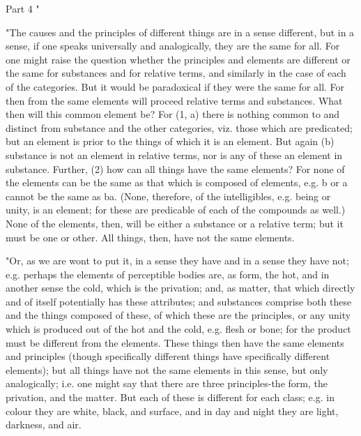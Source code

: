 Part 4 "

"The causes and the principles of different things are in a sense
different, but in a sense, if one speaks universally and analogically,
they are the same for all. For one might raise the question whether
the principles and elements are different or the same for substances
and for relative terms, and similarly in the case of each of the categories.
But it would be paradoxical if they were the same for all. For then
from the same elements will proceed relative terms and substances.
What then will this common element be? For (1, a) there is nothing
common to and distinct from substance and the other categories, viz.
those which are predicated; but an element is prior to the things
of which it is an element. But again (b) substance is not an element
in relative terms, nor is any of these an element in substance. Further,
(2) how can all things have the same elements? For none of the elements
can be the same as that which is composed of elements, e.g. b or a
cannot be the same as ba. (None, therefore, of the intelligibles,
e.g. being or unity, is an element; for these are predicable of each
of the compounds as well.) None of the elements, then, will be either
a substance or a relative term; but it must be one or other. All things,
then, have not the same elements. 

"Or, as we are wont to put it, in a sense they have and in a sense
they have not; e.g. perhaps the elements of perceptible bodies are,
as form, the hot, and in another sense the cold, which is the privation;
and, as matter, that which directly and of itself potentially has
these attributes; and substances comprise both these and the things
composed of these, of which these are the principles, or any unity
which is produced out of the hot and the cold, e.g. flesh or bone;
for the product must be different from the elements. These things
then have the same elements and principles (though specifically different
things have specifically different elements); but all things have
not the same elements in this sense, but only analogically; i.e. one
might say that there are three principles-the form, the privation,
and the matter. But each of these is different for each class; e.g.
in colour they are white, black, and surface, and in day and night
they are light, darkness, and air. 

